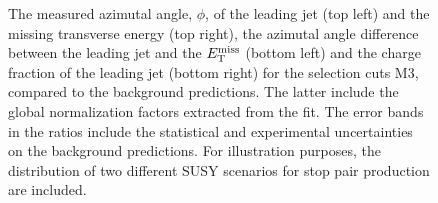 \begin{figure}[!ht]
\begin{center}
{    }
  \end{center}
  \caption[Kinematic distributions of the azimutal angle, $\phi$, of the leading jet and the missing transverse energy, the azimutal angle difference between the leading jet and the $\met$, and the charge fraction of the leading jet in the signal regions for the selection cuts of region M3, after the normalization factors extracted from the fit have been applied.]
{The measured azimutal angle, $\phi$, of the leading jet (top left) and the missing transverse energy (top right), the azimutal angle difference between the leading jet and the $\met$ (bottom left) and the charge fraction of the leading jet (bottom right) for the selection cuts M3, compared to the background predictions. The latter include the global normalization factors extracted from the fit. The error bands in the ratios include the statistical and experimental uncertainties on the background predictions. For illustration purposes, the distribution of two different SUSY scenarios for stop pair production are included.}
  \label{fig:Plot_M3_SR_Jet1}
\end{figure}


